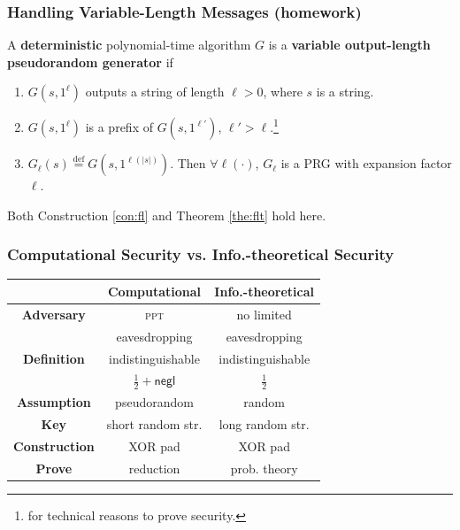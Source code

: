 \begin{frame}\frametitle{Handling Variable-Length Messages (homework)}
\begin{definition}\label{def:vlpg}
A \textbf{deterministic} polynomial-time algorithm $G$ is a \textbf{variable output-length pseudorandom generator} if
\begin{enumerate}
\item $G(s, 1^{\ell})$ outputs a string of length $\ell > 0$, where $s$ is a string.
\item $G(s, 1^{\ell})$ is a prefix of $G(s, 1^{\ell'})$, $\ell' > \ell$.\footnote{for technical reasons to prove security.}
\item $G_{\ell}(s) \overset{\text{def}}{=} G(s,1^{\ell(|s|)})$. Then $\forall \ell(\cdot)$, $G_{\ell}$ is a PRG with expansion factor $\ell$.
\end{enumerate}
\end{definition}
Both Construction \ref{con:fl} and Theorem \ref{the:flt} hold here.
\end{frame}
\begin{frame}\frametitle{Computational Security vs. Info.-theoretical Security}
\begin{center}
\begin{tabular}{|c|c|c|} \hline
                      & \textbf{Computational} & \textbf{Info.-theoretical} \\ \hline
\textbf{Adversary}    & \textsc{ppt} & no limited \\ 
                      & eavesdropping & eavesdropping\\ \hline 
\textbf{Definition}   & indistinguishable & indistinguishable \\ 
                      & $\frac{1}{2} + \mathsf{negl}$ & $\frac{1}{2}$ \\ \hline
\textbf{Assumption}   & pseudorandom & random   \\ \hline
\textbf{Key}	      & short random str. & long random str.\\ \hline
\textbf{Construction} & XOR pad & XOR pad \\ \hline 
\textbf{Prove}        & reduction & prob. theory  \\ \hline
\end{tabular}	
\end{center}
\end{frame}

